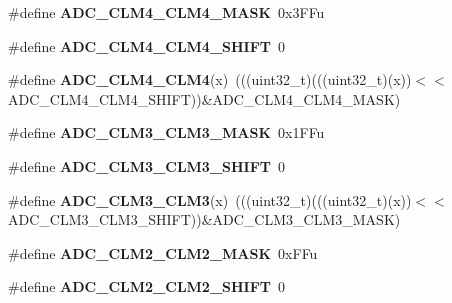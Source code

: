\begin{DoxyCompactItemize}
\item 
\#define {\bfseries A\+D\+C\+\_\+\+C\+L\+M4\+\_\+\+C\+L\+M4\+\_\+\+M\+A\+SK}~0x3\+F\+Fu\hypertarget{group__ADC__Register__Masks_ga9f8f5b63268c5b87f04ee884579a385b}{}\label{group__ADC__Register__Masks_ga9f8f5b63268c5b87f04ee884579a385b}

\item 
\#define {\bfseries A\+D\+C\+\_\+\+C\+L\+M4\+\_\+\+C\+L\+M4\+\_\+\+S\+H\+I\+FT}~0\hypertarget{group__ADC__Register__Masks_gafa9121fc54ce9386fdc4c1d05f45d0de}{}\label{group__ADC__Register__Masks_gafa9121fc54ce9386fdc4c1d05f45d0de}

\item 
\#define {\bfseries A\+D\+C\+\_\+\+C\+L\+M4\+\_\+\+C\+L\+M4}(x)~(((uint32\+\_\+t)(((uint32\+\_\+t)(x))$<$$<$A\+D\+C\+\_\+\+C\+L\+M4\+\_\+\+C\+L\+M4\+\_\+\+S\+H\+I\+FT))\&A\+D\+C\+\_\+\+C\+L\+M4\+\_\+\+C\+L\+M4\+\_\+\+M\+A\+SK)\hypertarget{group__ADC__Register__Masks_gad44edd7b22b26259838f02e5348e2449}{}\label{group__ADC__Register__Masks_gad44edd7b22b26259838f02e5348e2449}

\item 
\#define {\bfseries A\+D\+C\+\_\+\+C\+L\+M3\+\_\+\+C\+L\+M3\+\_\+\+M\+A\+SK}~0x1\+F\+Fu\hypertarget{group__ADC__Register__Masks_ga546b5a27d980deed324add231c050a6f}{}\label{group__ADC__Register__Masks_ga546b5a27d980deed324add231c050a6f}

\item 
\#define {\bfseries A\+D\+C\+\_\+\+C\+L\+M3\+\_\+\+C\+L\+M3\+\_\+\+S\+H\+I\+FT}~0\hypertarget{group__ADC__Register__Masks_ga9bdd0a97bea9576ea5c9eccd54c08940}{}\label{group__ADC__Register__Masks_ga9bdd0a97bea9576ea5c9eccd54c08940}

\item 
\#define {\bfseries A\+D\+C\+\_\+\+C\+L\+M3\+\_\+\+C\+L\+M3}(x)~(((uint32\+\_\+t)(((uint32\+\_\+t)(x))$<$$<$A\+D\+C\+\_\+\+C\+L\+M3\+\_\+\+C\+L\+M3\+\_\+\+S\+H\+I\+FT))\&A\+D\+C\+\_\+\+C\+L\+M3\+\_\+\+C\+L\+M3\+\_\+\+M\+A\+SK)\hypertarget{group__ADC__Register__Masks_gaccf9cd66317e1c61f7daacabd0d95904}{}\label{group__ADC__Register__Masks_gaccf9cd66317e1c61f7daacabd0d95904}

\item 
\#define {\bfseries A\+D\+C\+\_\+\+C\+L\+M2\+\_\+\+C\+L\+M2\+\_\+\+M\+A\+SK}~0x\+F\+Fu\hypertarget{group__ADC__Register__Masks_ga815d6f1bf2d38384c8fd0dd4f07f7a08}{}\label{group__ADC__Register__Masks_ga815d6f1bf2d38384c8fd0dd4f07f7a08}

\item 
\#define {\bfseries A\+D\+C\+\_\+\+C\+L\+M2\+\_\+\+C\+L\+M2\+\_\+\+S\+H\+I\+FT}~0\hypertarget{group__ADC__Register__Masks_ga945ed262c088eecda09d679df33ab193}{}\label{group__ADC__Register__Masks_ga945ed262c088eecda09d679df33ab193}


\end{DoxyCompactItemize}
